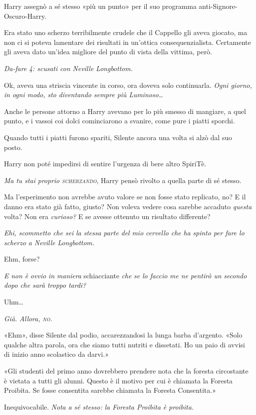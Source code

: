 Harry assegnò a sé stesso «più un punto» per il suo programma anti-Signore-Oscuro-Harry.

Era stato uno scherzo terribilmente crudele che il Cappello gli aveva giocato, ma non ci si poteva lamentare dei risultati in un’ottica consequenzialista. Certamente gli aveva dato un’idea migliore del punto di vista della vittima, però.

\textit{Da-fare 4: scusati con Neville Longbottom.}

Ok, aveva una striscia vincente in corso, ora doveva solo continuarla. \textit{Ogni giorno, in ogni modo, sto diventando sempre più Luminoso…}

Anche le persone attorno a Harry avevano per lo più smesso di mangiare, a quel punto, e i vassoi coi dolci cominciarono a svanire, come pure i piatti sporchi.

Quando tutti i piatti furono spariti, Silente ancora una volta si alzò dal suo posto.

Harry non poté impedirsi di sentire l’urgenza di bere altro SpiriTè.

\textit{Ma tu stai proprio \textsc{scherzando}}, Harry pensò rivolto a quella parte di sé stesso.

Ma l’esperimento non avrebbe avuto valore se non fosse stato replicato, no? E il danno era stato già fatto, giusto? Non voleva vedere cosa sarebbe accaduto \textit{questa} volta? Non era \textit{curioso?} E se avesse ottenuto un risultato differente?

\textit{Ehi, scommetto che sei la stessa parte del mio cervello che ha spinto per fare lo scherzo a Neville Longbottom.}

Ehm, forse?

\textit{E non è ovvio in maniera} schiacciante \textit{che se lo faccio me ne pentirò un secondo dopo che sarà troppo tardi?}

Uhm…

\textit{Già. Allora, \textsc{no.}}

«Ehm», disse Silente dal podio, accarezzandosi la lunga barba d’argento. «Solo qualche altra parola, ora che siamo tutti nutriti e dissetati. Ho un paio di avvisi di inizio anno scolastico da darvi.»

«Gli studenti del primo anno dovrebbero prendere nota che la foresta circostante è vietata a tutti gli alunni. Questo è il motivo per cui è chiamata la Foresta Proibita. Se fosse consentita sarebbe chiamata la Foresta Consentita.»

Inequivocabile. \textit{Nota a sé stesso: la Foresta Proibita è proibita.}

